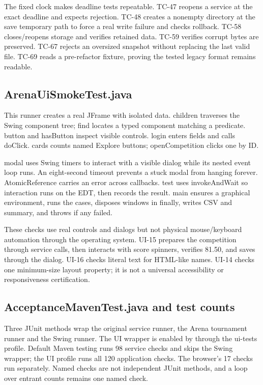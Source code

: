 \documentclass[12pt]{article}
\begin{document}
The fixed clock makes deadline tests repeatable. TC-47 reopens a service at the exact deadline and expects rejection. TC-48 creates a nonempty directory at the save temporary path to force a real write failure and checks rollback. TC-58 closes/reopens storage and verifies retained data. TC-59 verifies corrupt bytes are preserved. TC-67 rejects an oversized snapshot without replacing the last valid file. TC-69 reads a pre-refactor fixture, proving the tested legacy format remains readable.

\subsection{ArenaUiSmokeTest.java}
This runner creates a real JFrame with isolated data. children traverses the Swing component tree; find locates a typed component matching a predicate. button and hasButton inspect visible controls. login enters fields and calls doClick. cards counts named Explore buttons; openCompetition clicks one by ID.

modal uses Swing timers to interact with a visible dialog while its nested event loop runs. An eight-second timeout prevents a stuck modal from hanging forever. AtomicReference carries an error across callbacks. test uses invokeAndWait so interaction runs on the EDT, then records the result. main ensures a graphical environment, runs the cases, disposes windows in finally, writes CSV and summary, and throws if any failed.

These checks use real controls and dialogs but not physical mouse/keyboard automation through the operating system. UI-15 prepares the competition through service calls, then interacts with score spinners, verifies 81.50, and saves through the dialog. UI-16 checks literal text for HTML-like names. UI-14 checks one minimum-size layout property; it is not a universal accessibility or responsiveness certification.

\subsection{AcceptanceMavenTest.java and test counts}
Three JUnit methods wrap the original service runner, the Arena tournament runner and the Swing runner. The UI wrapper is enabled by  through the ui-tests profile. Default Maven testing runs 98 service checks and skips the Swing wrapper; the UI profile runs all 120 application checks. The browser's 17 checks run separately. Named checks are not independent JUnit methods, and a loop over entrant counts remains one named check.
\end{document}
